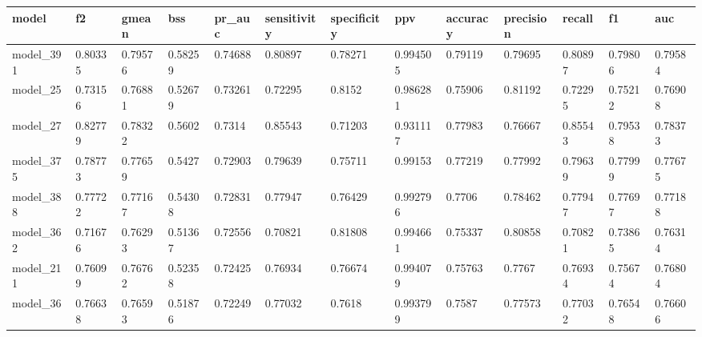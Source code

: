 \begin{tabular}{|l|l|l|l|l|l|l|l|l|l|l|l|l|}
\hline
\textbf{model} & \textbf{f2} & \textbf{gmean} & \textbf{bss} & \textbf{pr\_auc} & \textbf{sensitivity} & \textbf{specificity} & \textbf{ppv} & \textbf{accuracy} & \textbf{precision} & \textbf{recall} & \textbf{f1} & \textbf{auc} \\ \hline
model\_391     & 0.80335     & 0.79576        & 0.58259      & 0.74688          & 0.80897              & 0.78271              & 0.994505     & 0.79119           & 0.79695            & 0.80897         & 0.79806     & 0.79584      \\ \hline
model\_25      & 0.73156     & 0.76881        & 0.52679      & 0.73261          & 0.72295              & 0.8152               & 0.986281     & 0.75906           & 0.81192            & 0.72295         & 0.75212     & 0.76908      \\ \hline
model\_27      & 0.82779     & 0.78322        & 0.5602       & 0.7314           & 0.85543              & 0.71203              & 0.931117     & 0.77983           & 0.76667            & 0.85543         & 0.79538     & 0.78373      \\ \hline
model\_375     & 0.78773     & 0.77659        & 0.5427       & 0.72903          & 0.79639              & 0.75711              & 0.99153      & 0.77219           & 0.77992            & 0.79639         & 0.77999     & 0.77675      \\ \hline
model\_388     & 0.77722     & 0.77167        & 0.54308      & 0.72831          & 0.77947              & 0.76429              & 0.992796     & 0.7706            & 0.78462            & 0.77947         & 0.77697     & 0.77188      \\ \hline
model\_362     & 0.71676     & 0.76293        & 0.51367      & 0.72556          & 0.70821              & 0.81808              & 0.994661     & 0.75337           & 0.80858            & 0.70821         & 0.73865     & 0.76314      \\ \hline
model\_211     & 0.76099     & 0.76762        & 0.52358      & 0.72425          & 0.76934              & 0.76674              & 0.994079     & 0.75763           & 0.7767             & 0.76934         & 0.75674     & 0.76804      \\ \hline
model\_36      & 0.76638     & 0.76593        & 0.51876      & 0.72249          & 0.77032              & 0.7618               & 0.993799     & 0.7587            & 0.77573            & 0.77032         & 0.76548     & 0.76606      \\ \hline

\end{tabular}
